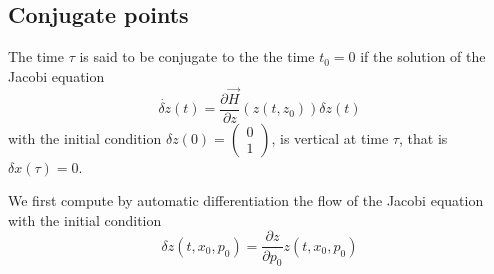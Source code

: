 \documentclass[11pt]{article}
\begin{document}
    \hypertarget{conjugate-points}{%
\subsection{Conjugate points}\label{conjugate-points}}

The time \(\tau\) is said to be conjugate to the the time \(t_0=0\) if
the solution of the Jacobi equation \[
\dot{\delta z}(t) = \dfrac{\partial \vec{H}}{\partial z}(z(t,z_0))\delta z(t)
\] with the initial condition
\(\delta z(0) = \begin{pmatrix}0\\1 \end{pmatrix}\), is vertical at time
\(\tau\), that is \(\delta x(\tau) = 0\).

We first compute by automatic differentiation the flow of the Jacobi
equation with the initial condition
\[\delta z(t,x_0,p_0)=\dfrac{\partial z}{\partial p_0}z(t,x_0,p_0)\]
\end{document}
